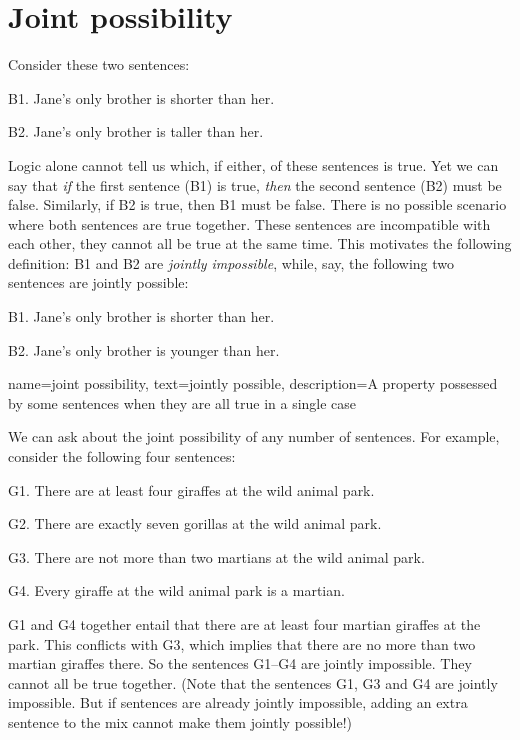 
\section{Joint possibility}

Consider these two sentences:
	\begin{ebullet}
		\item[B1.] Jane's only brother is shorter than her.
		\item[B2.] Jane's only brother is taller than her.
	\end{ebullet}
Logic alone cannot tell us which, if either, of these sentences is true. Yet we can say that \emph{if} the first sentence (B1) is true, \emph{then} the second sentence (B2) must be false. Similarly, if B2 is true, then B1 must be false. There is no possible scenario where both sentences are true together. These sentences are incompatible with each other, they cannot all be true at the same time. This motivates the following definition:
B1 and B2 are \emph{jointly impossible}, while, say, the following two sentences are jointly possible:
	\begin{ebullet}
		\item[B1.] Jane's only brother is shorter than her.
		\item[B2.] Jane's only brother is younger than her.
	\end{ebullet}

{
name=joint possibility,
text={jointly possible},
description={A property possessed by some sentences when they are all true in a single case}
}

We can ask about the joint possibility of any number of sentences. For example, consider the following four sentences:
	\begin{ebullet}	
		\item[G1.] \label{MartianGiraffes} There are at least four giraffes at the wild animal park.
		\item[G2.] There are exactly seven gorillas at the wild animal park.
		\item[G3.] There are not more than two martians at the wild animal park.
		\item[G4.] Every giraffe at the wild animal park is a martian.
	\end{ebullet}
G1 and G4 together entail that there are at least four martian giraffes at the park. This conflicts with G3, which implies that there are no more than two martian giraffes there. So the sentences G1--G4 are jointly impossible. They cannot all be true together. (Note that the sentences G1, G3 and G4 are jointly impossible. But if sentences are already jointly impossible, adding an extra sentence to the mix cannot make them jointly possible!)

